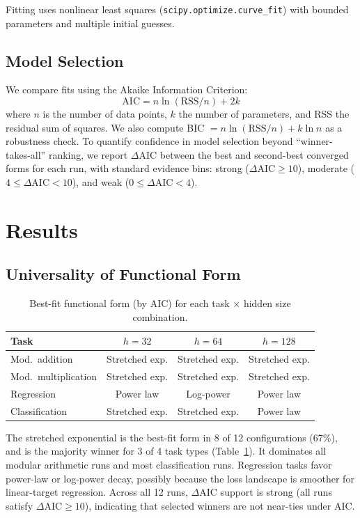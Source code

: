 \documentclass[11pt,a4paper]{article}
\begin{document}
Fitting uses nonlinear least squares (\texttt{scipy.optimize.curve\_fit}) with bounded parameters and multiple initial guesses.

\subsection{Model Selection}

We compare fits using the Akaike Information Criterion:
\[
\text{AIC} = n \ln(\text{RSS}/n) + 2k
\]
where $n$ is the number of data points, $k$ the number of parameters, and RSS the residual sum of squares. We also compute BIC $= n \ln(\text{RSS}/n) + k \ln n$ as a robustness check.
To quantify confidence in model selection beyond ``winner-takes-all'' ranking, we report $\Delta\text{AIC}$ between the best and second-best converged forms for each run, with standard evidence bins: strong ($\Delta\text{AIC}\ge 10$), moderate ($4\le\Delta\text{AIC}<10$), and weak ($0\le\Delta\text{AIC}<4$).

\section{Results}

\subsection{Universality of Functional Form}

\begin{table}[h]
\centering
\caption{Best-fit functional form (by AIC) for each task $\times$ hidden size combination.}
\label{tab:best_forms}
\begin{tabular}{lccc}
\toprule
Task & $h=32$ & $h=64$ & $h=128$ \\
\midrule
Mod.\ addition     & Stretched exp. & Stretched exp. & Stretched exp. \\
Mod.\ multiplication & Stretched exp. & Stretched exp. & Stretched exp. \\
Regression         & Power law      & Log-power      & Power law \\
Classification     & Stretched exp. & Stretched exp. & Power law \\
\bottomrule
\end{tabular}
\end{table}

The stretched exponential is the best-fit form in 8 of 12 configurations (67\%), and is the majority winner for 3 of 4 task types (Table~\ref{tab:best_forms}).
It dominates all modular arithmetic runs and most classification runs.
Regression tasks favor power-law or log-power decay, possibly because the loss landscape is smoother for linear-target regression.
Across all 12 runs, $\Delta\text{AIC}$ support is strong (all runs satisfy $\Delta\text{AIC}\ge 10$), indicating that selected winners are not near-ties under AIC.
\end{document}
